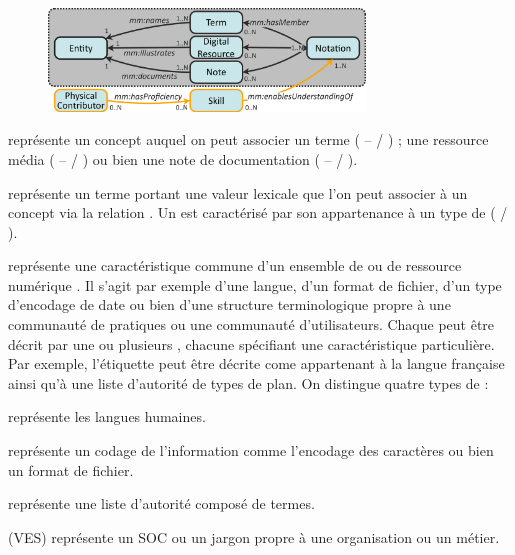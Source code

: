 \begin{figure}[ht!]
\centering
\includegraphics[width=0.75\textwidth]{./images/MOD-TermConcept-v5a.png}
\caption{}
\label{img:mj-ct}
\end{figure}


	 représente un concept auquel on peut associer
		un terme ( --  / ) ; une ressource média ( --  / ) ou bien une note de documentation ( --  / ).

	 représente un terme portant une valeur lexicale que l'on peut associer à un concept via la relation .
	Un  est caractérisé par son appartenance à un type de  ( / ).

	 représente une caractéristique commune d'un ensemble de  ou de ressource numérique . 
	Il s'agit par exemple d'une langue, d'un format de fichier, d'un type d'encodage de date ou bien d'une structure terminologique propre à une communauté de pratiques ou une communauté d'utilisateurs.
	Chaque  peut être décrit par une ou plusieurs , chacune spécifiant une caractéristique particulière.
	Par exemple, l'étiquette  peut être décrite come appartenant à la langue française ainsi qu'à une liste d'autorité de types de plan.
	On distingue quatre types de  : 
	\begin{liste}
		\item {} représente les langues humaines.
		\item {} représente un codage de l'information comme l'encodage des caractères ou bien un format de fichier. 
		\item {} représente une liste d'autorité composé de termes. 
		\item {} (VES) représente un SOC ou un jargon propre à une organisation ou un métier.\\
	\end{liste}

